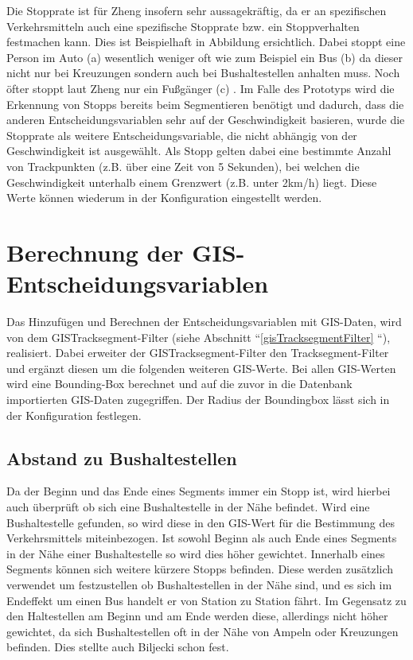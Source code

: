 Die Stopprate ist für Zheng insofern sehr aussagekräftig, da er an spezifischen Verkehrsmitteln auch eine spezifische Stopprate bzw. ein Stoppverhalten festmachen kann. Dies ist Beispielhaft in Abbildung  ersichtlich. Dabei stoppt eine Person im Auto (a) wesentlich weniger oft wie zum Beispiel ein Bus (b) da dieser nicht nur bei Kreuzungen sondern auch bei Bushaltestellen anhalten muss. Noch öfter stoppt laut Zheng nur ein Fußgänger (c) \cite{zheng_understanding_2010}. Im Falle des Prototyps wird die Erkennung von Stopps bereits beim Segmentieren benötigt und dadurch, dass die anderen Entscheidungsvariablen sehr auf der Geschwindigkeit basieren, wurde die Stopprate als weitere Entscheidungsvariable, die nicht abhängig von der Geschwindigkeit ist ausgewählt. Als Stopp gelten dabei eine bestimmte Anzahl von Trackpunkten (z.B. über eine Zeit von 5 Sekunden), bei welchen die Geschwindigkeit unterhalb einem Grenzwert (z.B. unter 2km/h) liegt. Diese Werte können wiederum in der Konfiguration eingestellt werden.

\clearpage

\section{Berechnung der GIS-Entscheidungsvariablen}
\label{gisdaten}
Das Hinzufügen und Berechnen der Entscheidungsvariablen mit GIS-Daten, wird von dem GISTracksegment-Filter (siehe Abschnitt ``\ref{gisTracksegmentFilter} ``), realisiert. Dabei erweiter der GISTracksegment-Filter den Tracksegment-Filter und ergänzt diesen um die folgenden weiteren GIS-Werte. Bei allen GIS-Werten wird eine Bounding-Box berechnet und auf die zuvor in die Datenbank importierten GIS-Daten zugegriffen. Der Radius der Boundingbox lässt sich in der Konfiguration festlegen.

\subsection{Abstand zu Bushaltestellen}
Da der Beginn und das Ende eines Segments immer ein Stopp ist, wird hierbei auch überprüft ob sich eine Bushaltestelle in der Nähe befindet. Wird eine Bushaltestelle gefunden, so wird diese in den GIS-Wert für die Bestimmung des Verkehrsmittels miteinbezogen. Ist sowohl Beginn als auch Ende eines Segments in der Nähe einer Bushaltestelle so wird dies höher gewichtet. 
Innerhalb eines Segments können sich weitere kürzere Stopps befinden. Diese werden zusätzlich verwendet um festzustellen ob Bushaltestellen in der Nähe sind, und es sich im Endeffekt um einen Bus handelt er von Station zu Station fährt. Im Gegensatz zu den Haltestellen am Beginn und am Ende werden diese, allerdings nicht höher gewichtet, da sich Bushaltestellen oft in der Nähe von Ampeln oder Kreuzungen befinden. Dies stellte auch Biljecki \cite{biljecki_transportation_2013} schon fest.

